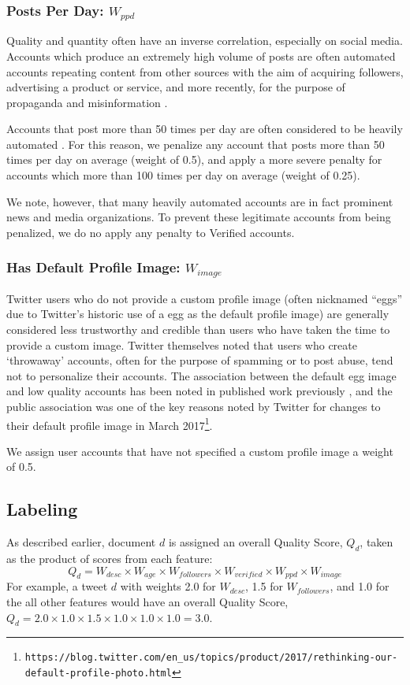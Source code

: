 \subsubsection{Posts Per Day: \(W_{ppd}\)}
Quality and quantity often have an inverse correlation, especially on social media.
Accounts which produce an extremely high volume of posts are often automated accounts repeating content from other sources with the aim of acquiring followers, advertising a product or service, and more recently, for the purpose of propaganda and misinformation \citep{Forelle15, Howard16}.

Accounts that post more than 50 times per day are often considered to be heavily automated \citep{Howard16}. For this reason, we penalize any account that posts more than 50 times per day on average (weight of 0.5), and apply a more severe penalty for accounts which more than 100 times per day on average (weight of 0.25).

We note, however, that many heavily automated accounts are in fact prominent news and media organizations. To prevent these legitimate accounts from being penalized, we do no apply any penalty to Verified accounts.

\subsubsection{Has Default Profile Image: \(W_{image}\)}
Twitter users who do not provide a custom profile image (often nicknamed ``eggs'' due to Twitter's historic use of a egg as the default profile image) are generally considered less trustworthy and credible \citep{Castillo11,Sikdar13, Gun14} than users who have taken the time to provide a custom image.
Twitter themselves noted that users who create `throwaway' accounts, often for the purpose of spamming or to post abuse, tend not to personalize their accounts.
The association between the default egg image and low quality accounts has been noted in published work previously \citep{Sikdar13}, and the public association was one of the key reasons noted by Twitter for changes to their default profile image in March 2017\footnote{\texttt{https://blog.twitter.com/en\_us/topics/product/2017/rethinking-our-\\default-profile-photo.html}}.

We assign user accounts that have not specified a custom profile image a weight of 0.5.

\subsection{Labeling}
As described earlier, document \(d\) is assigned an overall Quality Score, \(Q_d\), taken as the product of scores from each feature:
\begin{displaymath}
	Q_d = W_{desc} \times W_{age} \times W_{followers} \times W_{verified} \times W_{ppd} \times W_{image}
\end{displaymath}
For example, a tweet \(d\) with weights 2.0 for \(W_{desc}\), 1.5 for \(W_{followers}\), and 1.0 for the all other features would have an overall Quality Score, \(
	Q_d =  2.0 \times 1.0 \times 1.5 \times 1.0 \times 1.0  \times 1.0 = 3.0 \).

